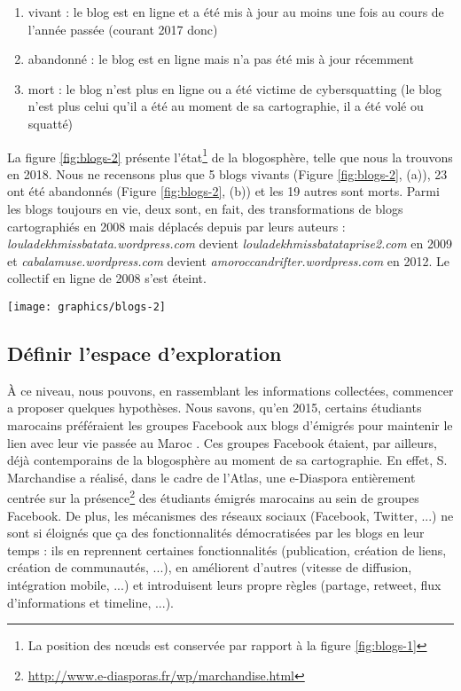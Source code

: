 \documentclass[symmetric,justified,marginals=raggedouter]{tufte-book}
\begin{document}
\begin{enumerate}  
\item vivant : le blog est en ligne et a été mis à jour au moins une fois au cours de l'année passée (courant 2017 donc)
\item abandonné : le blog est en ligne mais n'a pas été mis à jour récemment 
\item mort : le blog n'est plus en ligne ou a été victime de cybersquatting (le blog n'est plus celui qu'il a été au moment de sa cartographie, il a été volé ou squatté)
\end{enumerate}

\noindent La figure \ref{fig:blogs-2} présente l'état\footnote{La position des nœuds est conservée par rapport à la figure \ref{fig:blogs-1}} de la blogosphère, telle que nous la trouvons en 2018. Nous ne recensons plus que 5 blogs vivants (Figure \ref{fig:blogs-2}, (a)), 23 ont été abandonnés (Figure \ref{fig:blogs-2}, (b)) et les 19 autres sont morts. Parmi les blogs toujours en vie, deux sont, en fait, des transformations de blogs cartographiés en 2008 mais déplacés depuis par leurs auteurs : \textit{louladekhmissbatata.wordpress.com} devient \textit{louladekhmissbatataprise2.com} en 2009 et \textit{cabalamuse.wordpress.com} devient \textit{amoroccandrifter.wordpress.com} en 2012. Le collectif en ligne de 2008 s'est éteint.

\begin{figure*}
  \texttt{[image: graphics/blogs-2]}
  \caption{La blogosphère en 2018, (a) blogs vivants, (b) blogs vivants et abandonnés, la position est conservée}
  \label{fig:blogs-2}
\end{figure*}   

\subsection{Définir l'espace d'exploration}

\noindent À ce niveau, nous pouvons, en rassemblant les informations collectées, commencer a proposer quelques hypothèses. Nous savons, qu'en 2015, certains étudiants marocains préféraient les groupes Facebook aux blogs d'émigrés pour maintenir le lien avec leur vie passée au Maroc \citep{khouzaimi_e-diasporas_2015}. Ces groupes Facebook étaient, par ailleurs, déjà contemporains de la blogosphère au moment de sa cartographie. En effet, S. Marchandise a réalisé, dans le cadre de l'Atlas, une e-Diaspora \citep{marchandise_facebook_2014} entièrement centrée sur la présence\footnote{\url{http://www.e-diasporas.fr/wp/marchandise.html}} des étudiants émigrés marocains au sein de groupes Facebook. De plus, les mécanismes des réseaux sociaux (Facebook, Twitter, ...) ne sont si éloignés que ça des fonctionnalités démocratisées par les blogs en leur temps \citep{kwak_what_2010} : ils en reprennent certaines fonctionnalités (publication, création de liens, création de communautés, ...), en améliorent d'autres (vitesse de diffusion, intégration mobile, ...) et introduisent leurs propre règles (partage, retweet, flux d'informations et timeline, ...).
\end{document}
